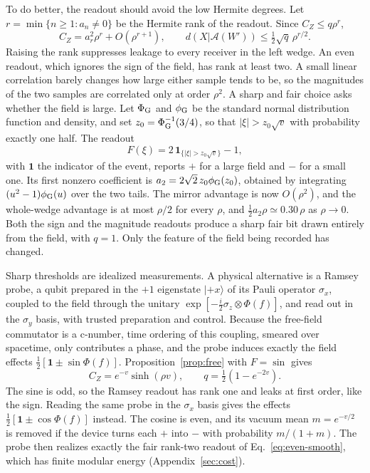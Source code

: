 \documentclass[11pt,a4paper]{article}
\providecommand{\openone}{\mathbf{1}}
\newcommand{\A}{\mathcal A}
\newcommand{\id}{\openone}
\begin{document}
To do better, the readout should avoid the low Hermite degrees. Let $r=\min\{n\ge1:a_n\ne0\}$ be the Hermite rank of the readout. Since $C_Z\le q\rho^r$,
\begin{equation}
 C_Z=a_r^2\rho^r+O(\rho^{r+1}),\qquad
 d(X|\A(W'))\le\tfrac12\sqrt q\,\rho^{r/2}.
 \label{eq:rank}
\end{equation}
Raising the rank suppresses leakage to every receiver in the left wedge. An even readout, which ignores the sign of the field, has rank at least two. A small linear correlation barely changes how large either sample tends to be, so the magnitudes of the two samples are correlated only at order $\rho^2$. A sharp and fair choice asks whether the field is large. Let $\Phi_{\rm G}$ and $\phi_{\rm G}$ be the standard normal distribution function and density, and set $z_0=\Phi_{\rm G}^{-1}(3/4)$, so that $|\xi|>z_0\sqrt v$ with probability exactly one half. The readout
\begin{equation}
 F(\xi)=2\,\mathbf1_{\{|\xi|>z_0\sqrt v\}}-1,
 \label{eq:magnitude}
\end{equation}
with $\mathbf 1$ the indicator of the event, reports $+$ for a large field and $-$ for a small one. Its first nonzero coefficient is $a_2=2\sqrt2\,z_0\phi_{\rm G}(z_0)$, obtained by integrating $(u^2-1)\phi_{\rm G}(u)$ over the two tails. The mirror advantage is now $O(\rho^2)$, and the whole-wedge advantage is at most $\rho/2$ for every $\rho$, and $\tfrac12a_2\rho\simeq0.30\,\rho$ as $\rho\to0$. Both the sign and the magnitude readouts produce a sharp fair bit drawn entirely from the field, with $q=1$. Only the feature of the field being recorded has changed.

Sharp thresholds are idealized measurements. A physical alternative is a Ramsey probe, a qubit prepared in the $+1$ eigenstate $|{+}x\rangle$ of its Pauli operator $\sigma_x$, coupled to the field through the unitary $\exp[-\tfrac i2\sigma_z\otimes\Phi(f)]$, and read out in the $\sigma_y$ basis, with trusted preparation and control. Because the free-field commutator is a c-number, time ordering of this coupling, smeared over spacetime, only contributes a phase, and the probe induces exactly the field effects $\tfrac12[\id\pm\sin\Phi(f)]$. Proposition~\ref{prop:free} with $F=\sin$ gives
\begin{equation}
 C_Z=e^{-v}\sinh(\rho v),\qquad q=\tfrac12(1-e^{-2v}).
 \label{eq:ramsey}
\end{equation}
The sine is odd, so the Ramsey readout has rank one and leaks at first order, like the sign. Reading the same probe in the $\sigma_x$ basis gives the effects $\tfrac12[\id\pm\cos\Phi(f)]$ instead. The cosine is even, and its vacuum mean $m=e^{-v/2}$ is removed if the device turns each $+$ into $-$ with probability $m/(1+m)$. The probe then realizes exactly the fair rank-two readout of Eq.~\eqref{eq:even-smooth}, which has finite modular energy (Appendix~\ref{sec:cost}).
\end{document}

